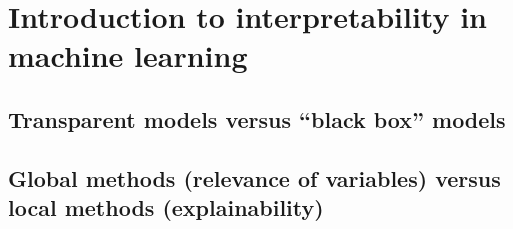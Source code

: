 \chapter{Introduction to interpretability in machine learning}

\section{Transparent models versus ``black box'' models}

\section{Global methods (relevance of variables) versus local methods (explainability)}
